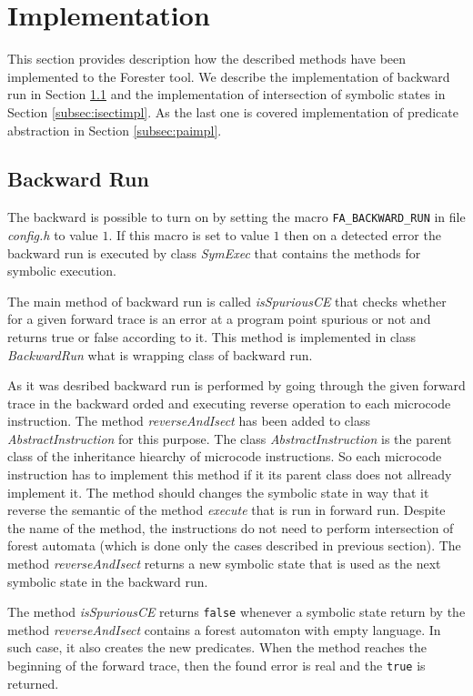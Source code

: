 \section{Implementation}
\label{sec:impl}

This section provides description how the described methods have been implemented
to the Forester tool.
We describe the implementation of backward run in Section \ref{subsec:bwimpl}
and the implementation of intersection of symbolic states in Section \ref{subsec:isectimpl}.
As the last one is covered implementation of predicate abstraction in Section \ref{subsec:paimpl}.

\subsection{Backward Run}
\label{subsec:bwimpl}

The backward is possible to turn on by setting the macro {\tt FA\_BACKWARD\_RUN}
in file \emph{config.h} to value $1$.
If this macro is set to value $1$ then on a detected error
the backward run is executed by class \emph{SymExec} that
contains the methods for symbolic execution.

The main method of backward run is called \emph{isSpuriousCE} that
checks whether for a given forward trace is an error at a program point
spurious or not and returns true or false according to it.
This method is implemented in class \emph{BackwardRun} what is wrapping
class of backward run.

As it was desribed backward run is performed by going through the given
forward trace in the backward orded and executing reverse operation to each
microcode instruction.
The method \emph{reverseAndIsect} has been added to class \emph{AbstractInstruction}
for this purpose.
The class \emph{AbstractInstruction} is the parent class of the inheritance hiearchy of
microcode instructions.
So each microcode instruction has to implement this method if it its parent class does not
allready implement it.
The method should changes the symbolic state in way that it reverse the semantic of
the method \emph{execute} that is run in forward run.
Despite the name of the method, the instructions do not need to perform
intersection of forest automata (which is done only the cases described in
previous section).
The method \emph{reverseAndIsect} returns a new symbolic state that
is used as the next symbolic state in the backward run.

The method \emph{isSpuriousCE} returns {\tt false} whenever
a symbolic state return by the method \emph{reverseAndIsect}
contains a forest automaton with empty language.
In such case, it also  creates the new predicates.
When the method reaches the beginning of the forward
trace, then the found error is real and the {\tt true}
is returned.

